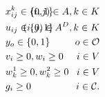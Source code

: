 \documentclass{article}
\begin{document}
\begin{alignat}{3}
    \label{mod:c33}        & x^k_{ij} \in \{0,1\}                                                                                                                                                                                                                                                                   & \hspace{-20mm}  (i,j) \in A , k \in K  \hspace{0mm}                                              \\
    \label{mod:c34}        & u_{ij} \in \{0,1\}                                                                                                                                                                                                                                                                     & \hspace{-20mm}  (i,j) \in A^D , k \in K  \hspace{0mm}                                            \\
    \label{mod:c36}        & y_o \in \{0,1\}                                                                                                                                                                                                                                                                        & \hspace{-20mm}  o \in \mathcal{O}                                                                \\
    \label{mod:c37}        & v_i \geq 0,  w_i \geq 0                                                                                                                                                                                                                                                                & \hspace{-20mm}  i \in V                                                                          \\
    \label{mod:c38}        & w^1_{k} \geq 0,  w^2_k \geq 0                                                                                                                                                                                                                                                          & \hspace{-20mm}  i \in V                                                                          \\
    \label{mod:cend}       & g_i \geq 0                                                                                                                                                                                                                                                                             & \hspace{-20mm}  i \in \mathcal{C}.
\end{alignat}
\end{document}
